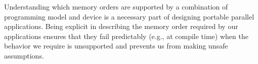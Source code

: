 Understanding which memory orders are supported by a combination of programming model and device is a necessary part of designing portable parallel applications. Being explicit in describing the memory order required by our applications ensures that they fail predictably (e.g., at compile time) when the behavior we require is unsupported and prevents us from making unsafe assumptions.\par







































